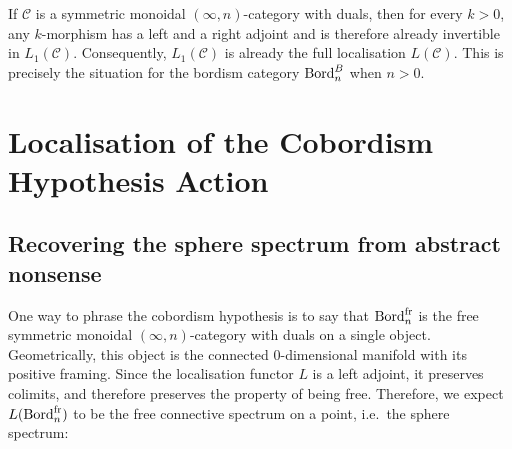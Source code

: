 \documentclass{amsart}
\begin{document}
\begin{remark}\label{rem:L-duals}
If $\mathcal{C}$ is a symmetric monoidal $(\infty,n)$-category with duals, then for every $k > 0$, any $k$-morphism has a left and a right adjoint \cite[Definition~2.3.13+Definition~2.3.16]{MR2555928} and is therefore already invertible in $L_1(\mathcal{C})$. Consequently, $L_1(\mathcal{C})$  is already the full localisation $L(\mathcal{C})$. This is precisely the situation for the bordism category $\operatorname{Bord}_n^{B}$ when $n > 0$.
\end{remark}
\section{Localisation of the Cobordism Hypothesis Action}\label{sec:localisation}


\subsection{Recovering the sphere spectrum from abstract nonsense}
\label{sec:abstract}

One way to phrase the cobordism hypothesis is to say that $\operatorname{Bord}^{\mathrm{fr}}_n$ is the free symmetric monoidal $(\infty,n)$-category with duals on a single object.
Geometrically, this object is the connected $0$-dimensional manifold with its positive framing.
Since the localisation functor $L$ is a left adjoint, it preserves colimits, and therefore preserves the property of being free.
Therefore, we expect $L(\operatorname{Bord}^{\mathrm{fr}}_n)$ to be the free connective spectrum on a point, i.e.\ the sphere spectrum:
\end{document}
